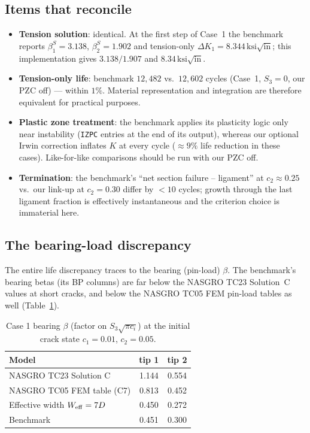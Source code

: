 \documentclass[11pt]{article}
\newcommand{\ksqin}{\,\mathrm{ksi\sqrt{in}}}
\begin{document}
\subsection{Items that reconcile}

\begin{itemize}
\item \textbf{Tension solution}: identical. At the first step of Case~1 the
  benchmark reports $\beta^{S}_1=3.138$, $\beta^{S}_2=1.902$ and tension-only
  $\Delta K_1=8.344\ksqin$; this implementation gives $3.138/1.907$ and
  $8.34\ksqin$.
\item \textbf{Tension-only life}: benchmark $12{,}482$ vs.\ $12{,}602$ cycles
  (Case~1, $S_3=0$, our PZC off) --- within $1\%$. Material representation and
  integration are therefore equivalent for practical purposes.
\item \textbf{Plastic zone treatment}: the benchmark applies its plasticity
  logic only near instability (\texttt{IZPC} entries at the end of its
  output), whereas our optional Irwin correction inflates $K$ at every cycle
  ($\approx 9\%$ life reduction in these cases). Like-for-like comparisons
  should be run with our PZC off.
\item \textbf{Termination}: the benchmark's ``net section failure --
  ligament'' at $c_2\approx0.25$ vs.\ our link-up at $c_2=0.30$ differ by
  $<10$ cycles; growth through the last ligament fraction is effectively
  instantaneous and the criterion choice is immaterial here.
\end{itemize}

\subsection{The bearing-load discrepancy}
\label{sec:bearing}

The entire life discrepancy traces to the bearing (pin-load) $\beta$. The
benchmark's bearing betas (its BP columns) are far below the NASGRO TC23
Solution~C values at short cracks, and below the NASGRO TC05 FEM pin-load
tables as well (Table~\ref{tab:bp}).

\begin{table}[h]
\centering
\caption{Case 1 bearing $\beta$ (factor on $S_3\sqrt{\pi c_i}$) at the
initial crack state $c_1=0.01$, $c_2=0.05$.}
\label{tab:bp}
\begin{tabular}{lcc}
\toprule
Model & tip 1 & tip 2\\
\midrule
NASGRO TC23 Solution C            & 1.144 & 0.554\\
NASGRO TC05 FEM table (C7)        & 0.813 & 0.452\\
Effective width $W_{\rm eff}=7D$  & 0.450 & 0.272\\
Benchmark                          & 0.451 & 0.300\\
\bottomrule
\end{tabular}
\end{table}
\end{document}
